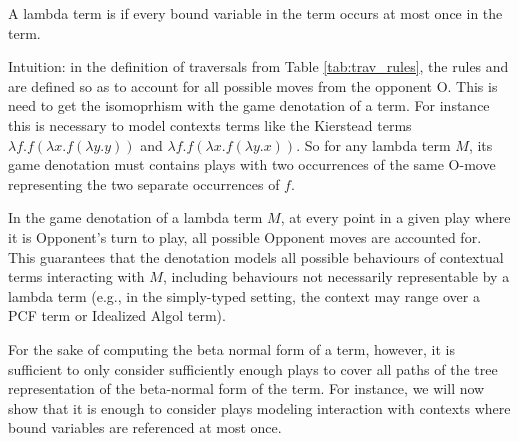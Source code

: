 \documentclass{article}
\theoremstyle{definition}
\begin{document}
A lambda term is  if every bound variable in the term occurs at most once in the term.

Intuition: in the definition of traversals from Table \ref{tab:trav_rules}, the rules  and  are defined so as to
account for all possible moves from the opponent O. This is need to get the isomoprhism with the game denotation of a term. For instance this is necessary to model contexts terms like the Kierstead terms $\lambda f.f(\lambda x.f(\lambda y.y))$ and $\lambda f.f(\lambda x.f(\lambda y.x))$. So for any lambda term $M$, its game denotation must contains plays with two occurrences of the same O-move representing the two separate occurrences of $f$.

In the game denotation of a lambda term $M$, at every point in a given play where it is Opponent's turn to play, all possible Opponent moves are accounted for. This guarantees that the denotation models all possible behaviours of contextual terms interacting with $M$, including behaviours not necessarily representable by a lambda term (e.g., in the simply-typed setting, the context may range over a PCF term or Idealized Algol term).

For the sake of computing the beta normal form of a term, however, it is sufficient to only consider sufficiently enough plays to cover all paths of the tree representation of the beta-normal form of the term. For instance, we will now show that it is enough to consider plays modeling interaction with contexts where bound variables are referenced at most once.
\end{document}
